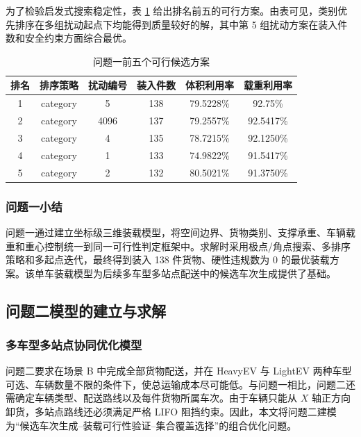 ﻿\documentclass[UTF8,a4paper,12pt]{ctexart}
\newcommand{\paperbold}{\CJKfontspec[AutoFakeBold=4]{SimSun}\bfseries}
\newcommand{\modelsubpoint}[1]{\vspace{0.35em}\noindent{\paperbold #1}\par\vspace{0.12em}}
\begin{document}
	为了检验启发式搜索稳定性，表 \ref{tab:q1_top_solutions} 给出排名前五的可行方案。由表可见，类别优先排序在多组扰动起点下均能得到质量较好的解，其中第 5 组扰动方案在装入件数和安全约束方面综合最优。
	
	\begin{table}[H]
		\centering
		\caption{问题一前五个可行候选方案}
		\label{tab:q1_top_solutions}
		\begin{tabular}{c c c c c c}
			\toprule
			排名 & 排序策略 & 扰动编号 & 装入件数 & 体积利用率 & 载重利用率 \\
			\midrule
			1 & category & 5 & 138 & 79.5228\% & 92.75\% \\
			2 & category & 4096 & 137 & 79.2557\% & 92.5417\% \\
			3 & category & 4 & 135 & 78.7215\% & 92.1250\% \\
			4 & category & 1 & 133 & 74.9822\% & 91.5417\% \\
			5 & category & 2 & 132 & 80.5021\% & 91.3750\% \\
			\bottomrule
		\end{tabular}
	\end{table}
	
	\vspace{0.4em}
	\subsubsection{问题一小结}
	
	问题一通过建立坐标级三维装载模型，将空间边界、货物类别、支撑承重、车辆载重和重心控制统一到同一可行性判定框架中。求解时采用极点/角点搜索、多排序策略和多起点迭代，最终得到装入 138 件货物、硬性违规数为 0 的最优装载方案。该单车装载模型为后续多车型多站点配送中的候选车次生成提供了基础。
	
	\subsection{问题二模型的建立与求解}
	
	\subsubsection{多车型多站点协同优化模型}
	
	\modelsubpoint{问题二求解思路}
	
	问题二要求在场景 B 中完成全部货物配送，并在 HeavyEV 与 LightEV 两种车型可选、车辆数量不限的条件下，使总运输成本尽可能低。与问题一相比，问题二还需确定车辆类型、配送路线以及每件货物所属车次。由于车辆只能从 $X$ 轴正方向卸货，多站点路线还必须满足严格 LIFO 阻挡约束。因此，本文将问题二建模为“候选车次生成--装载可行性验证--集合覆盖选择”的组合优化问题。
	
\end{document}
